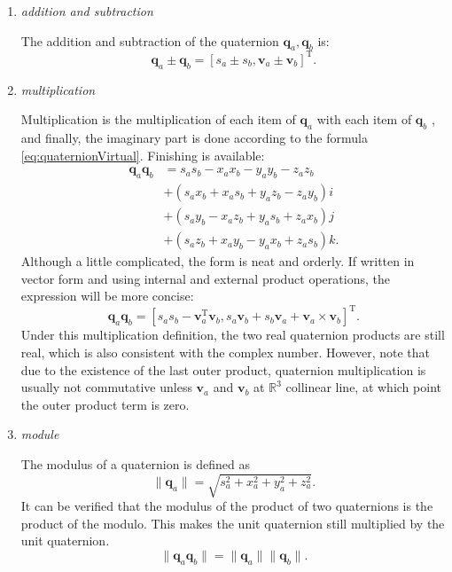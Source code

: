\begin{enumerate}
	\item { \emph {addition and subtraction}}
	
The addition and subtraction of the 	quaternion $ \bm {q}_a, \bm {q}_b $ is:
	\begin{equation} 	
	\bm{q}_a \pm \bm{q}_b = \left[ s_a \pm s_b, \bm{v}_a \pm \bm{v}_b \right]^\mathrm{T}.
	\end{equation}
	\item { \emph {multiplication}}
	
	Multiplication is the multiplication of each item of $ \bm {q}_a $ with each item of $ \bm {q}_b $ , and finally, the imaginary part is done according to the formula \eqref {eq:quaternionVirtual}. Finishing is available:
	\begin{equation}
	\begin{aligned}
	\bm{q}_a \bm{q}_b &= {s_a}{s_b} - {x_a}{x_b} - {y_a}{y_b} - {z_a}{z_b}\\
	&+ \left( {{s_a}{x_b} + {x_a}{s_b} + {y_a}{z_b} - {z_a}{y_b}} \right)i\\
	&+ \left( {{s_a}{y_b} - {x_a}{z_b} + {y_a}{s_b} + {z_a}{x_b}} \right)j\\
	&+ \left( {{s_a}{z_b} + {x_a}{y_b} - {y_a}{x_b} + {z_a}{s_b}} \right)k.
	\end{aligned}
	\end{equation}
	Although a little complicated, the form is neat and orderly. If written in vector form and using internal and external product operations, the expression will be more concise:
	\begin{equation}
	\bm{q}_a \bm{q}_b = \left[ s_a s_b - \bm{v}_a^\mathrm{T} \bm{v}_b, s_a\bm{v}_b + s_b\bm{v}_a + \bm{v}_a \times \bm{v}_b \right]^\mathrm{T}.
	\end{equation}
	Under this multiplication definition, the two real quaternion products are still real, which is also consistent with the complex number. However, note that due to the existence of the last outer product, quaternion multiplication is usually not commutative unless $ \bm {v}_a $ and $ \bm {v}_b $ at $ \mathbb {R}^ 3 $ collinear line, at which point the outer product term is zero.

	\item { \emph {module} }
		
	The modulus of a quaternion is defined as
	\begin{equation}
	\| \bm{q}_a \| = \sqrt{ s_a^2 + x_a^2 + y_a^2 + z_a^2 }.
	\end{equation}
	It can be verified that the modulus of the product of two quaternions is the product of the modulo. This makes the unit quaternion still multiplied by the unit quaternion.
	\begin{equation}
	\| \bm{q}_a \bm{q}_b \| = \|\bm{q}_a \| \| \bm{q}_b \|.
	\end{equation}
	

\end{enumerate}
